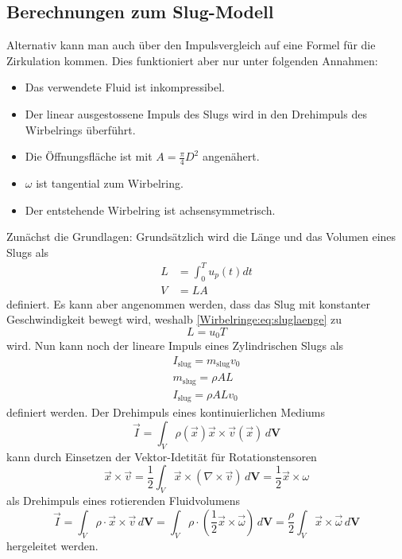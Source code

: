 \subsection{Berechnungen zum Slug-Modell}
Alternativ kann man auch über den Impulsvergleich auf eine Formel für die Zirkulation kommen.
Dies funktioniert aber nur unter folgenden Annahmen:
\begin{itemize}
    \item Das verwendete Fluid ist inkompressibel.
    \item Der linear ausgestossene Impuls des Slugs wird in den Drehimpuls des Wirbelrings überführt.
    \item Die Öffnungsfläche ist mit $A = \frac{\pi}{4} D^2$ angenähert.
    \item $\omega$ ist tangential zum Wirbelring.
    \item Der entstehende Wirbelring ist achsensymmetrisch.
\end{itemize} 

Zunächst die Grundlagen:
Grundsätzlich wird die Länge und das Volumen eines Slugs als
\begin{align}
    L
    &=
    \int_{0}^{T}u_p(t)dt\\
    \label{Wirbelringe:eq:sluglaenge}
    V
    &=
    LA
\end{align}
definiert.
Es kann aber angenommen werden, dass das Slug mit konstanter Geschwindigkeit bewegt wird, weshalb \eqref{Wirbelringe:eq:sluglaenge} zu
\begin{equation}
    L
    =
    u_0T
\end{equation}
wird.
Nun kann noch der lineare Impuls eines Zylindrischen Slugs als
\begin{align}
    I_{\text{slug}}
    =
    m_{\text{slug}}v_0\\
    m_{\text{slug}}
    =
    \rho AL\\
    I_{\text{slug}}
    =
    \rho ALv_0
    \label{Wirbelringe:eq:slugImp}
\end{align}
definiert werden.
Der Drehimpuls eines kontinuierlichen Mediums
\begin{equation*}
    \vec{I}
    =
    \int_{V}\rho(\vec{x})\vec{x}\times\vec{v}(\vec{x})\,d\mathbf{V}
\end{equation*}
kann durch Einsetzen der Vektor-Idetität für Rotationstensoren \cite{Wirbelringe:batchelor1967}
\begin{equation*}
    \vec{x}\times\vec{v}
    =
    \frac{1}{2}\int_{V}\vec{x}\times(\nabla\times\vec{v})\,d\mathbf{V}
    =
    \frac{1}{2}\vec{x}\times\omega
\end{equation*}
als Drehimpuls eines rotierenden Fluidvolumens 
\begin{equation}
    \vec{I}
    =
    \int_{V}\rho\cdot\vec{x}\times\vec{v}\,d\mathbf{V}
    =
    \int_{V}\rho\cdot(\frac{1}{2}\vec{x}\times\vec{\omega})\,d\mathbf{V}
    =
    \frac{\rho}{2}\int_{V}\vec{x}\times\vec{\omega}\,d\mathbf{V}
    \label{Wirbelringe:eq:Drehimpuls}
\end{equation}
hergeleitet werden. 

